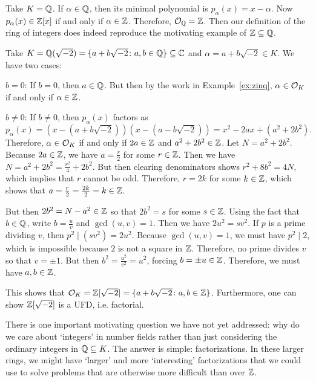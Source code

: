 \begin{ex}\label{ex:zinq}
Take $K= \mathbb{Q}$. If $\alpha \in \mathbb{Q}$, then its minimal polynomial is $p_\alpha(x)= x - \alpha$. Now $p_\alpha(x) \in \mathbb{Z}[x]$ if and only if $\alpha \in \mathbb{Z}$. Therefore, $\mathcal{O}_{\mathbb{Q}}= \mathbb{Z}$. Then our definition of the ring of integers does indeed reproduce the motivating example of $\mathbb{Z} \subseteq \mathbb{Q}$. \xqed \pskip
\end{ex}


\begin{ex}
Take $K=\mathbb{Q}(\sqrt{-2})= \{ a + b \sqrt{-2} \colon a,b \in \mathbb{Q} \} \subseteq \mathbb{C}$ and $\alpha= a + b\sqrt{-2} \in K$. We have two cases: \pskip

\noindent $b=0$: If $b=0$, then $a \in \mathbb{Q}$. But then by the work in Example~\ref{ex:zinq}, $\alpha \in \mathcal{O}_K$ if and only if $\alpha \in \mathbb{Z}$. \pskip

\noindent $b\neq 0$: If $b \neq 0$,  then $p_\alpha(x)$ factors as 
	\[
	p_\alpha(x)=(x-(a+b\sqrt{-2}))(x-(a-b\sqrt{-2}))=x^2-2ax+(a^2+2b^2).
	\]
Therefore, $\alpha \in \mathcal{O}_K$ if and only if $2a \in \mathbb{Z}$ and $a^2+2b^2 \in \mathbb{Z}$. Let $N= a^2 + 2b^2$. Because $2a \in \mathbb{Z}$, we have $a= \frac{r}{2}$ for some $r \in \mathbb{Z}$. Then we have $N= a^2 + 2b^2= \frac{r^2}{4} + 2b^2$. But then clearing denominators shows $r^2 + 8b^2= 4N$, which implies that $r$ cannot be odd. Therefore, $r= 2k$ for some $k \in \mathbb{Z}$, which shows that $a= \frac{r}{2}= \frac{2k}{2}= k \in \mathbb{Z}$. 

But then $2b^2= N - a^2 \in \mathbb{Z}$ so that $2b^2= s$ for some $s \in \mathbb{Z}$. Using the fact that $b \in \mathbb{Q}$, write $b= \frac{u}{v}$ and $\gcd(u, v)= 1$. Then we have $2u^2= sv^2$. If $p$ is a prime dividing $v$, then $p^2 \mid (sv^2)= 2u^2$. Because $\gcd(u,v)=1$, we must have $p^2 \mid 2$, which is impossible because $2$ is not a square in $\mathbb{Z}$. Therefore, no prime divides $v$ so that $v= \pm 1$. But then $b^2= \frac{u^2}{v^2}= u^2$, forcing $b= \pm u \in \mathbb{Z}$. Therefore, we must have $a, b \in \mathbb{Z}$. \pskip
	
This shows that $\mathcal{O}_K= \mathbb{Z}[\sqrt{-2}]= \{ a + b \sqrt{-2} \colon a,b \in \mathbb{Z} \}$. Furthermore, one can show $\mathbb{Z}[\sqrt{-2}]$ is a UFD, i.e. factorial. \xqed \pskip
\end{ex}


There is one important motivating question we have not yet addressed: why do we care about `integers' in number fields rather than just considering the ordinary integers in $\mathbb{Q} \subseteq K$. The answer is simple: factorizations. In these larger rings, we might have `larger' and more `interesting' factorizations that we could use to solve problems that are otherwise more difficult than over $\mathbb{Z}$. 


